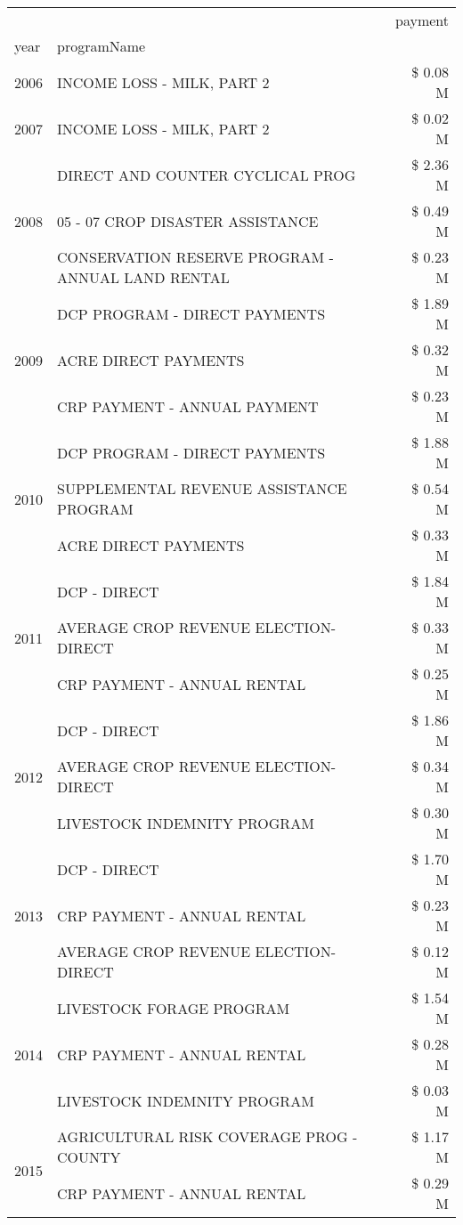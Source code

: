 \begin{tabular}{llr}
\toprule
 &  & payment \\
year & programName &  \\
\midrule
2006 & INCOME LOSS - MILK, PART 2 & \$ 0.08 M \\
\cline{1-3}
2007 & INCOME LOSS - MILK, PART 2 & \$ 0.02 M \\
\cline{1-3}
\multirow[t]{3}{*}{2008} & DIRECT AND COUNTER CYCLICAL PROG & \$ 2.36 M \\
 & 05 - 07 CROP DISASTER ASSISTANCE & \$ 0.49 M \\
 & CONSERVATION RESERVE PROGRAM - ANNUAL LAND RENTAL & \$ 0.23 M \\
\cline{1-3}
\multirow[t]{3}{*}{2009} & DCP PROGRAM - DIRECT PAYMENTS & \$ 1.89 M \\
 & ACRE DIRECT PAYMENTS & \$ 0.32 M \\
 & CRP PAYMENT - ANNUAL PAYMENT & \$ 0.23 M \\
\cline{1-3}
\multirow[t]{3}{*}{2010} & DCP PROGRAM - DIRECT PAYMENTS & \$ 1.88 M \\
 & SUPPLEMENTAL REVENUE ASSISTANCE PROGRAM & \$ 0.54 M \\
 & ACRE DIRECT PAYMENTS & \$ 0.33 M \\
\cline{1-3}
\multirow[t]{3}{*}{2011} & DCP - DIRECT & \$ 1.84 M \\
 & AVERAGE CROP REVENUE ELECTION-DIRECT & \$ 0.33 M \\
 & CRP PAYMENT - ANNUAL RENTAL & \$ 0.25 M \\
\cline{1-3}
\multirow[t]{3}{*}{2012} & DCP - DIRECT & \$ 1.86 M \\
 & AVERAGE CROP REVENUE ELECTION-DIRECT & \$ 0.34 M \\
 & LIVESTOCK INDEMNITY PROGRAM & \$ 0.30 M \\
\cline{1-3}
\multirow[t]{3}{*}{2013} & DCP - DIRECT & \$ 1.70 M \\
 & CRP PAYMENT - ANNUAL RENTAL & \$ 0.23 M \\
 & AVERAGE CROP REVENUE ELECTION-DIRECT & \$ 0.12 M \\
\cline{1-3}
\multirow[t]{3}{*}{2014} & LIVESTOCK FORAGE PROGRAM & \$ 1.54 M \\
 & CRP PAYMENT - ANNUAL RENTAL & \$ 0.28 M \\
 & LIVESTOCK INDEMNITY PROGRAM & \$ 0.03 M \\
\cline{1-3}
\multirow[t]{3}{*}{2015} & AGRICULTURAL RISK COVERAGE PROG - COUNTY & \$ 1.17 M \\
 & CRP PAYMENT - ANNUAL RENTAL & \$ 0.29 M \\

\end{tabular}
